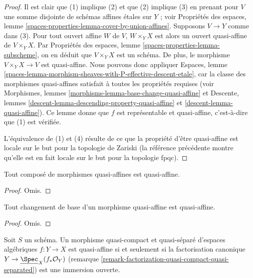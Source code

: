 \begin{proof}
Il est clair que (1) implique (2) et que (2) implique (3) en prenant
pour $V$ une somme disjointe de schémas affines étales sur $Y$ ; voir
Propriétés des espaces,
lemme \ref{spaces-properties-lemma-cover-by-union-affines}.
Supposons $V \to Y$ comme dans (3). Pour tout ouvert affine $W$ de $V$,
$W \times_Y X$ est alors un ouvert quasi-affine de $V \times_Y X$. Par
Propriétés des espaces, lemme \ref{spaces-properties-lemma-subscheme},
on en déduit que $V \times_Y X$ est un schéma. De plus, le morphisme
$V \times_Y X \to V$ est quasi-affine. Nous pouvons donc appliquer
Espaces,
lemme \ref{spaces-lemma-morphism-sheaves-with-P-effective-descent-etale},
car la classe des morphismes quasi-affines satisfait à toutes les
propriétés requises (voir
Morphismes, lemmes \ref{morphisms-lemma-base-change-quasi-affine} et
Descente, lemmes \ref{descent-lemma-descending-property-quasi-affine}
et \ref{descent-lemma-quasi-affine}). Ce lemme donne
que $f$ est représentable et quasi-affine, c'est-à-dire que (1) est vérifiée.

\medskip\noindent
L'équivalence de (1) et (4) résulte de ce que la propriété
d'être quasi-affine est locale sur le but pour la topologie de Zariski (la référence précédente
montre qu'elle est en fait locale sur le but pour la topologie fpqc).
\end{proof}

\begin{lemma}
\label{lemma-composition-quasi-affine}
Tout composé de morphismes quasi-affines est quasi-affine.
\end{lemma}

\begin{proof}
Omis.
\end{proof}

\begin{lemma}
\label{lemma-base-change-quasi-affine}
Tout changement de base d'un morphisme quasi-affine est quasi-affine.
\end{lemma}

\begin{proof}
Omis.
\end{proof}

\begin{lemma}
\label{lemma-characterize-quasi-affine}
Soit $S$ un schéma.
Un morphisme quasi-compact et quasi-séparé d'espaces algébriques
$f : Y \to X$ est quasi-affine si et seulement si la factorisation canonique
$Y \to \underline{\Spec}_X(f_*\mathcal{O}_Y)$
(remarque \ref{remark-factorization-quasi-compact-quasi-separated})
est une immersion ouverte.
\end{lemma}

